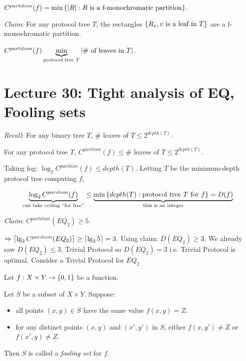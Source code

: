 \begin{definition}
    $C^{partition}(f) = \min \left \{ \left | R \right |: R \text{ is a f-monochromatic partition} \right \}$.
\end{definition}

\emph{Claim}: For any protocol tree $T$, the rectangles $\left \{ R_v, v \text{ is a leaf in } T \right \}$ are a f-monochromatic partition.

\begin{corollary}
    $C^{partition}(f) \underbrace{\min}_{\text{protocol tree } T} \left | \# \text{ of leaves in } T \right |$.
\end{corollary}

\section*{Lecture 30: Tight analysis of EQ, Fooling sets}

\emph{Recall}: For any binary tree $T$, \# leaves of $T \leq 2^{depth(T)}$.

\begin{corollary}
    For any protocol tree $T$, $C^{parition}(f) \leq \#$ leaves of $T \leq 2^{depth(T)}$.
\end{corollary}

Taking log: $\log_2C^{parition}(f) \leq depth(T)$. Letting $T$ be the minimum-depth protocol tree computing $f$,

\begin{dmath*}
    \underbrace{\log_2C^{parition}(f)}_{\text{can take ceiling ``for free''}} \leq \underbrace{\min \set{depth(T): \text{protocol tree } T \text{ for } f} = D(f)}_{\text{this is an integer}}
\end{dmath*}

\emph{Claim}: $C^{partition}(EQ_2) \geq 5$.

$\Rightarrow \left \lceil \lg_2 C^{parition}(EQ_2) \right \rceil \geq \left \lceil \lg_2 5 \right \rceil = 3$. Using claim: $D(EQ_2) \geq 3$. We already saw $D(EQ_2) \leq 3$, Trivial Protocol so $D(EQ_2) = 3$ i.e. Trivial Protocol is optimal. Consider a Trivial Protocol for $EQ_2$

Let $f: X \times Y \rightarrow \left \{ 0, 1 \right \}$ be a function.

\begin{definition}
    Let $S$ be a subset of $X \times Y$. Suppose:

    \begin{itemize}
        \item all points $(x, y) \in S$ have the same value $f(x, y) = Z$.
        \item for any distinct points $(x, y)$ and $(x', y')$ in $S$, either $f(x, y') \neq Z$ or $f(x', y) \neq Z$.
    \end{itemize}

    Then $S$ is called a \emph{fooling set} for $f$.
\end{definition}

